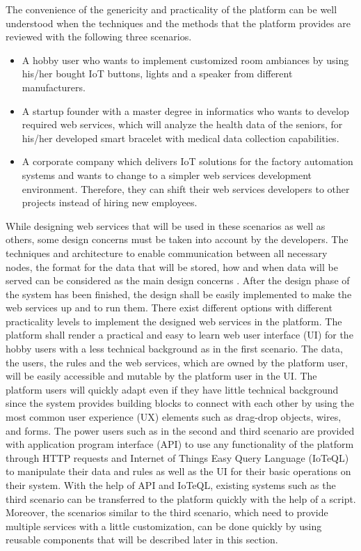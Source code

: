 The convenience of the genericity and practicality of the platform can be well understood when the techniques and the methods that the platform provides are reviewed with the following three scenarios.
\begin{itemize}

 \item A hobby user who wants to implement customized room ambiances by using his/her bought IoT buttons, lights and a speaker from different manufacturers.
 \item A startup founder with a master degree in informatics who wants to develop required web services, which will analyze the health data of the seniors, for his/her developed smart bracelet with medical data collection capabilities.
 \item A corporate company which delivers IoT solutions for the factory automation systems and wants to change to a simpler web services development environment. Therefore, they can shift their web services developers to other projects instead of hiring new employees.

\end{itemize}
While designing web services that will be used in these scenarios as well as others, some design concerns must be taken into account by the developers. The techniques and architecture to enable communication between all necessary nodes, the format for the data that will be stored, how and when data will be served can be considered as the main design concerns \cite{6651222}. After the design phase of the system has been finished, the design shall be easily implemented to make the web services up and to run them. 
There exist different options with different practicality levels to implement the designed web services in the platform. The platform shall render a practical and easy to learn web user interface (UI) for the hobby users with a less technical background as in the first scenario. The data, the users, the rules and the web services, which are owned by the platform user, will be easily accessible and mutable by the platform user in the UI. The platform users will quickly adapt even if they have little technical background since the system provides building blocks to connect with each other by using the most common user experience (UX) elements such as drag-drop objects, wires, and forms. The power users such as in the second and third scenario are provided with application program interface (API) to use any functionality of the platform through HTTP requests and Internet of Things Easy Query Language (IoTeQL) to manipulate their data and rules as well as the UI for their basic operations on their system. With the help of API and IoTeQL, existing systems such as the third scenario can be transferred to the platform quickly with the help of a script. Moreover, the scenarios similar to the third scenario, which need to provide multiple services with a little customization, can be done quickly by using reusable components that will be described later in this section.

